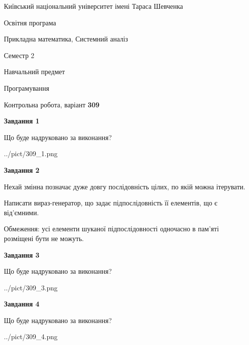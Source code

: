 \documentclass[12pt, ukrainian]{article}
\begin{document}
{{\begin {small}\par
{ \center  Київський національний університет імені Тараса Шевченка \par}
{\parbox {5 cm}{Освітня програма \hfill}{\parbox {8 cm}{Прикладна математика, Системний аналіз \hfill}}\parbox {5 cm}{\hfill Семестр 2}}\par
{\parbox {5 cm} {Навчальний предмет \hfill}\parbox {7 cm}{Програмування \hfill}\parbox {6cm}{\hfill}\par}\vspace{-7pt} \end{small}}{\center Контрольна робота, варіант  \No \textbf
{ 309 }\par}}
{
\begin {large}
{\begin {center}\textbf{Завдання 1}\end {center}}\par
Що буде надруковано за виконання?\par\par
\begin{center}
	{../pict/309_1.png}
\end{center}
\newpage

{\begin {center}\textbf{Завдання 2}\end {center}}\par
Нехай змінна  позначає дуже довгу послідовність цілих, по якій можна ітерувати.

Написати вираз-генератор, що задає підпослідовність її елементів, що є від'єм\-ни\-ми.

Обмеження: усі елементи шуканої підпослідовності одночасно в пам'яті розміщені бути не можуть.\par
\newpage

{\begin {center}\textbf{Завдання 3}\end {center}}\par
Що буде надруковано за виконання?
\begin{center}
	{../pict/309_3.png}
\end{center}
\newpage

{\begin {center}\textbf{Завдання 4}\end {center}}\par
Що буде надруковано за виконання?\par
\begin{center}
	{../pict/309_4.png}
\end{center}
\newpage


\end{large}}
\end{document}
